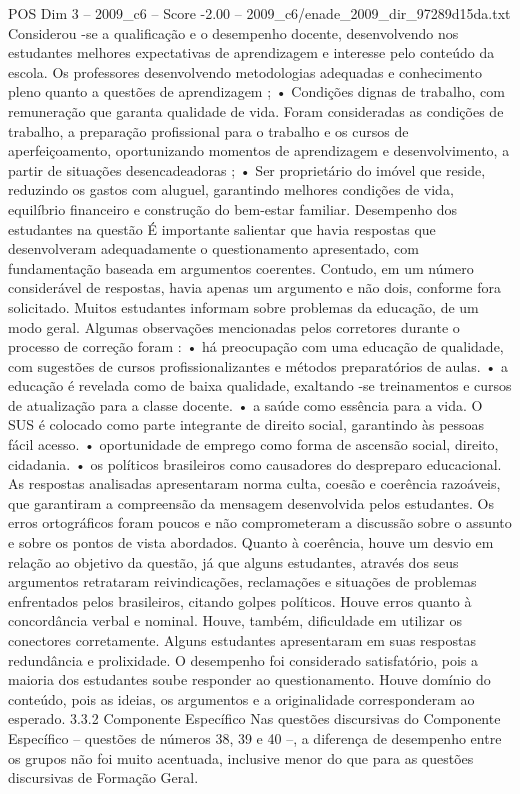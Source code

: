 \begin{textsample}{POS Dim 3 – 2009\_c6 – Score -2.00 – 2009\_c6/enade\_2009\_dir\_97289d15da.txt}
Considerou -se a qualificação e o desempenho docente, desenvolvendo nos estudantes melhores expectativas de aprendizagem e interesse pelo conteúdo da escola.
Os professores desenvolvendo metodologias adequadas e conhecimento pleno quanto a questões de aprendizagem ; • Condições dignas de trabalho, com remuneração que garanta qualidade de vida.
Foram consideradas as condições de trabalho, a preparação profissional para o trabalho e os cursos de aperfeiçoamento, oportunizando momentos de aprendizagem e desenvolvimento, a partir de situações desencadeadoras ; • Ser proprietário do imóvel que reside, reduzindo os gastos com aluguel, garantindo melhores condições de vida, equilíbrio financeiro e construção do bem-estar familiar.
Desempenho dos estudantes na questão É importante salientar que havia respostas que desenvolveram adequadamente o questionamento apresentado, com fundamentação baseada em argumentos coerentes.
Contudo, em um número considerável de respostas, havia apenas um argumento e não dois, conforme fora solicitado.
Muitos estudantes informam sobre problemas da educação, de um modo geral.
Algumas observações mencionadas pelos corretores durante o processo de correção foram : • há preocupação com uma educação de qualidade, com sugestões de cursos profissionalizantes e métodos preparatórios de aulas. • a educação é revelada como de baixa qualidade, exaltando -se treinamentos e cursos de atualização para a classe docente. • a saúde como essência para a vida.
O SUS é colocado como parte integrante de direito social, garantindo às pessoas fácil acesso. • oportunidade de emprego como forma de ascensão social, direito, cidadania. • os políticos brasileiros como causadores do despreparo educacional.
As respostas analisadas apresentaram norma culta, coesão e coerência razoáveis, que garantiram a compreensão da mensagem desenvolvida pelos estudantes.
Os erros ortográficos foram poucos e não comprometeram a discussão sobre o assunto e sobre os pontos de vista abordados.
Quanto à coerência, houve um desvio em relação ao objetivo da questão, já que alguns estudantes, através dos seus argumentos retrataram reivindicações, reclamações e situações de problemas enfrentados pelos brasileiros, citando golpes políticos.
Houve erros quanto à concordância verbal e nominal.
Houve, também, dificuldade em utilizar os conectores corretamente.
Alguns estudantes apresentaram em suas respostas redundância e prolixidade.
O desempenho foi considerado satisfatório, pois a maioria dos estudantes soube responder ao questionamento.
Houve domínio do conteúdo, pois as ideias, os argumentos e a originalidade corresponderam ao esperado. 3.3.2 Componente Específico Nas questões discursivas do Componente Específico – questões de números 38, 39 e 40 –, a diferença de desempenho entre os grupos não foi muito acentuada, inclusive menor do que para as questões discursivas de Formação Geral.

\end{textsample}
